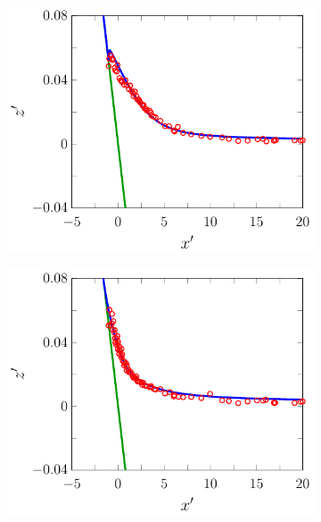 \begin{figure}
	\begin{subfigure}{0.5\textwidth}
		\includegraphics[width=\textwidth]{./chp6/figures/Experiment/Synolakis/H0p0185/FDVM/50s.pdf}
		\vspace{0.5cm}
	\end{subfigure}%
	\begin{subfigure}{0.5\textwidth}
		\includegraphics[width=\textwidth]{./chp6/figures/Experiment/Synolakis/H0p0185/FDVM/60s.pdf}
		\vspace{0.5cm}
	\end{subfigure}
	\begin{subfigure}{0.5\textwidth}

\end{subfigure}
\end{figure}
